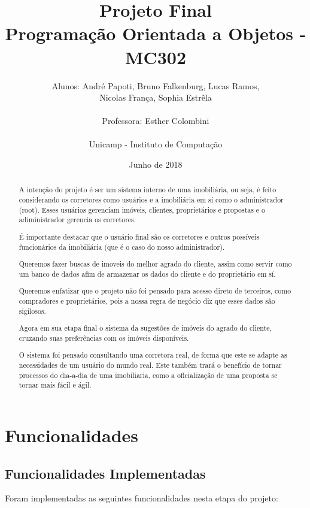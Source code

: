 \documentclass[a4paper,11pt,fleqn]{article}
\title{Projeto Final\\
Programação Orientada a Objetos - MC302}
\author{Alunos: André Papoti, Bruno Falkenburg, Lucas Ramos, \\
Nicolas França, Sophia Estrêla\\\\
Professora: Esther Colombini\\\\
Unicamp - Instituto de Computação\\}
\date{Junho de 2018}
\begin{document}
\maketitle

\begin{abstract}
\noindent

A intenção do projeto é ser um sistema interno de uma imobiliária, ou seja, é feito considerando os corretores como usuários e a imobiliária em sí como o administrador (root). Esses usuários gerenciam imóveis, clientes, proprietários e propostas e o adiministrador gerencia os corretores.

É importante destacar que o usuário final são os corretores e outros possíveis funcionários da imobiliária (que é o caso do nosso administrador).

Queremos fazer buscas de imoveis do melhor agrado do cliente, assim como servir como um banco de dados afim de armazenar os dados do cliente e do proprietário em sí.

Queremos enfatizar que o projeto não foi pensado para acesso direto de terceiros, como compradores e proprietários, pois a nossa regra de negócio diz que esses dados são sigilosos.

Agora em sua etapa final o sistema da sugestões de imóveis do agrado do cliente, cruzando suas preferências com os imóveis disponíveis.

O sistema foi pensado consultando uma corretora real, de forma que este se adapte as necessidades de um usuário do mundo real. Este também trará o benefício de tornar processos do dia-a-dia de uma imobiliaria, como a oficialização de uma proposta se tornar mais fácil e ágil.

\end{abstract}

\section{Funcionalidades}
\label{s:funcionalidades}

\subsection{Funcionalidades Implementadas}
\label{ss:func-impl}


Foram implementadas as seguintes funcionalidades nesta etapa do projeto:
\end{document}
